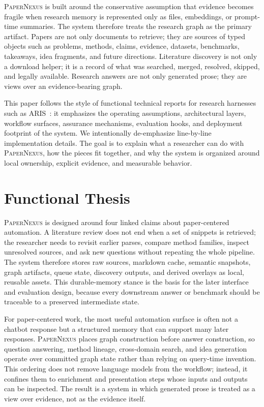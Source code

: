 \documentclass[11pt]{article}
\newcommand{\papernexus}{\textsc{PaperNexus}}
\begin{document}
\papernexus{} is built around the conservative assumption that evidence becomes fragile when research memory is represented only as files, embeddings, or prompt-time summaries. The system therefore treats the research graph as the primary artifact. Papers are not only documents to retrieve; they are sources of typed objects such as problems, methods, claims, evidence, datasets, benchmarks, takeaways, idea fragments, and future directions. Literature discovery is not only a download helper; it is a record of what was searched, merged, resolved, skipped, and legally available. Research answers are not only generated prose; they are views over an evidence-bearing graph.

This paper follows the style of functional technical reports for research harnesses such as ARIS~\citep{yang2026aris}: it emphasizes the operating assumptions, architectural layers, workflow surfaces, assurance mechanisms, evaluation hooks, and deployment footprint of the system. We intentionally de-emphasize line-by-line implementation details. The goal is to explain what a researcher can do with \papernexus{}, how the pieces fit together, and why the system is organized around local ownership, explicit evidence, and measurable behavior.

\section{Functional Thesis}

\papernexus{} is designed around four linked claims about paper-centered automation. A literature review does not end when a set of snippets is retrieved; the researcher needs to revisit earlier parses, compare method families, inspect unresolved sources, and ask new questions without repeating the whole pipeline. The system therefore stores raw sources, markdown cache, semantic snapshots, graph artifacts, queue state, discovery outputs, and derived overlays as local, reusable assets. This durable-memory stance is the basis for the later interface and evaluation design, because every downstream answer or benchmark should be traceable to a preserved intermediate state.

For paper-centered work, the most useful automation surface is often not a chatbot response but a structured memory that can support many later responses. \papernexus{} places graph construction before answer construction, so question answering, method lineage, cross-domain search, and idea generation operate over committed graph state rather than relying on query-time invention. This ordering does not remove language models from the workflow; instead, it confines them to enrichment and presentation steps whose inputs and outputs can be inspected. The result is a system in which generated prose is treated as a view over evidence, not as the evidence itself.
\end{document}
